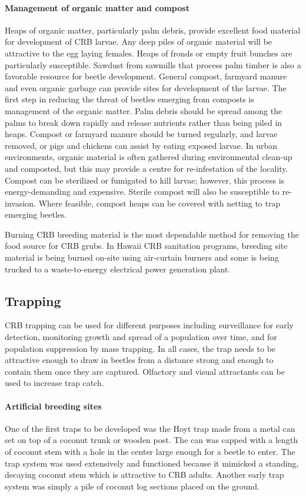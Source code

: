 \documentclass[twocolumn,letterpaper]{scrartcl}
\begin{document}
\paragraph{Management of organic matter and compost}
Heaps  of  organic  matter,  particularly  palm  debris,  provide  excellent  food  material  for  development  of  CRB larvae. Any deep piles of organic material will be attractive to the egg laying females. Heaps of fronds or empty fruit bunches are particularly susceptible. Sawdust from sawmills that process palm timber is also a favorable resource for beetle development. General compost, farmyard manure and even organic garbage can provide sites for development of the larvae. The first step in reducing the threat of beetles emerging from composts is management of the organic matter. Palm debris should be spread among the palms to break down rapidly and release nutrients rather than being piled in heaps. Compost or farmyard manure should be turned regularly, and larvae removed, or pigs and chickens can assist by eating exposed larvae. In urban environments, organic material is often gathered during environmental clean-up and composted, but this may provide a centre for re-infestation of the locality. Compost can be sterilized or fumigated to kill larvae; however, this process is energy-demanding  and  expensive.  Sterile  compost  will  also  be  susceptible  to  re-invasion. Where  feasible,  compost heaps can be covered with netting to trap emerging beetles.

Burning CRB breeding material is the most dependable method for removing the food source for CRB grubs. In Hawaii CRB sanitation programs, breeding site material is being burned on-site using air-curtain burners and some is being trucked to a waste-to-energy electrical power generation plant. 

\subsection{Trapping}

CRB trapping can be used for different purposes including surveillance for early detection, monitoring growth and spread of a population over time, and for population suppression by mass trapping. In all cases, the trap needs to be attractive enough to draw in beetles from a distance strong and enough to contain them once they are captured. Olfactory and visual attractants can be used to increase trap catch. 

\paragraph{Artificial breeding sites} One of the first traps to be developed was the Hoyt trap made from a metal can set on top of a coconut trunk or wooden post. The can was capped with a length of coconut stem with a hole in the center large enough for a beetle to enter. The trap system was used extensively and functioned because it mimicked a standing, decaying coconut stem which is attractive to CRB adults. Another early trap system was simply a pile of coconut log sections placed on the ground.
\end{document}
